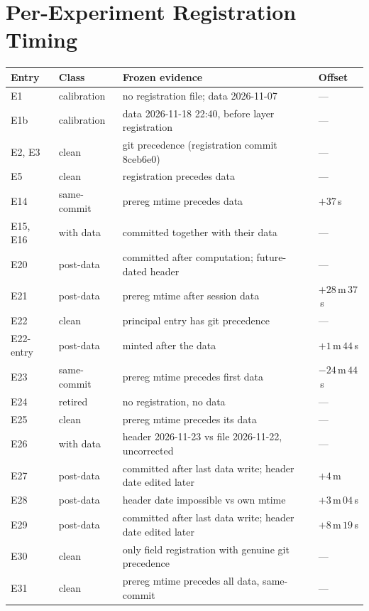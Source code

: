 \section{Per-Experiment Registration Timing}
\label{sec:supp-registration}

\begin{center}
\label{tab:registration}
\scriptsize
\setlength{\tabcolsep}{3pt}
\begin{tabular}{@{}llp{}l@{}}
\toprule
Entry & Class & Frozen evidence & Offset \\
\midrule
E1 & calibration & no registration file; data 2026-11-07 & --- \\
E1b & calibration & data 2026-11-18 22:40, before layer registration & --- \\
E2, E3 & clean & git precedence (registration commit 8ceb6e0) & --- \\
E5 & clean & registration precedes data & --- \\
E14 & same-commit & prereg mtime precedes data & $+37$\,s \\
E15, E16 & with data & committed together with their data & --- \\
E20 & post-data & committed after computation; future-dated header & --- \\
E21 & post-data & prereg mtime after session data & $+28$\,m\,$37$\,s \\
E22 & clean & principal entry has git precedence & --- \\
E22-entry & post-data & minted after the data & $+1$\,m\,$44$\,s \\
E23 & same-commit & prereg mtime precedes first data & $-24$\,m\,$44$\,s \\
E24 & retired & no registration, no data & --- \\
E25 & clean & prereg mtime precedes its data & --- \\
E26 & with data & header 2026-11-23 vs file 2026-11-22, uncorrected & --- \\
E27 & post-data & committed after last data write; header date edited later & $+4$\,m \\
E28 & post-data & header date impossible vs own mtime & $+3$\,m\,$04$\,s \\
E29 & post-data & committed after last data write; header date edited later & $+8$\,m\,$19$\,s \\
E30 & clean & only field registration with genuine git precedence & --- \\
E31 & clean & prereg mtime precedes all data, same-commit & --- \\
\bottomrule
\end{tabular}
\end{center}

